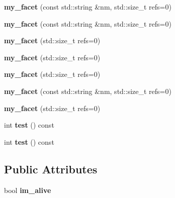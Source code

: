 \begin{DoxyCompactItemize}
\item 
\mbox{\label{structmy__facet_a6729ecd86319119e683a0c214f4c49ed}} 
{\bfseries my\+\_\+facet} (const std\+::string \&nm, std\+::size\+\_\+t refs=0)
\item 
\mbox{\label{structmy__facet_a6729ecd86319119e683a0c214f4c49ed}} 
{\bfseries my\+\_\+facet} (const std\+::string \&nm, std\+::size\+\_\+t refs=0)
\item 
\mbox{\label{structmy__facet_aff29b1cbf5e107557c0f3763905c67c0}} 
{\bfseries my\+\_\+facet} (std\+::size\+\_\+t refs=0)
\item 
\mbox{\label{structmy__facet_aff29b1cbf5e107557c0f3763905c67c0}} 
{\bfseries my\+\_\+facet} (std\+::size\+\_\+t refs=0)
\item 
\mbox{\label{structmy__facet_aff29b1cbf5e107557c0f3763905c67c0}} 
{\bfseries my\+\_\+facet} (std\+::size\+\_\+t refs=0)
\item 
\mbox{\label{structmy__facet_a6729ecd86319119e683a0c214f4c49ed}} 
{\bfseries my\+\_\+facet} (const std\+::string \&nm, std\+::size\+\_\+t refs=0)
\item 
\mbox{\label{structmy__facet_aff29b1cbf5e107557c0f3763905c67c0}} 
{\bfseries my\+\_\+facet} (std\+::size\+\_\+t refs=0)
\item 
\mbox{\label{structmy__facet_a06effa53222d7b3fad33d0ad1a1c77cc}} 
int {\bfseries test} () const
\item 
\mbox{\label{structmy__facet_a06effa53222d7b3fad33d0ad1a1c77cc}} 
int {\bfseries test} () const
\end{DoxyCompactItemize}
\subsection*{Public Attributes}
\begin{DoxyCompactItemize}
\item 
\mbox{\label{structmy__facet_a203e2e67798cb09099a3ed834906dc92}} 
bool {\bfseries im\+\_\+alive}
\end{DoxyCompactItemize}
